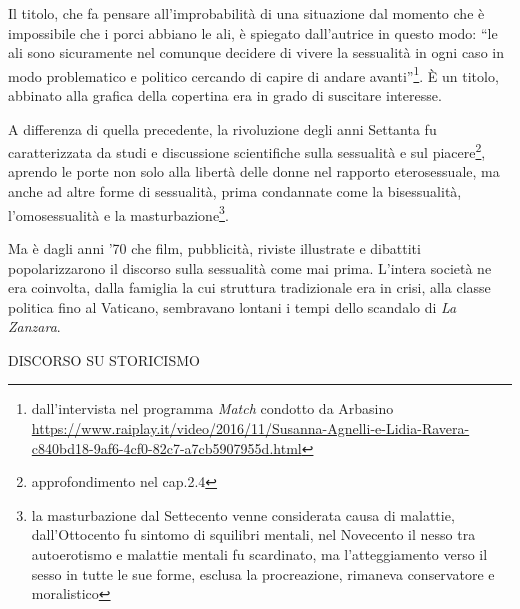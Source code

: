 Il titolo, che fa pensare all'improbabilità di una situazione dal momento che è impossibile che i porci abbiano le ali, è spiegato dall'autrice in questo modo: \enquote{le ali sono sicuramente nel comunque decidere di vivere la sessualità in ogni caso in modo problematico e politico cercando di capire di andare avanti}\footnote{dall'intervista nel programma \textit{Match} condotto da Arbasino \url{ https://www.raiplay.it/video/2016/11/Susanna-Agnelli-e-Lidia-Ravera-c840bd18-9af6-4cf0-82c7-a7cb5907955d.html}}.
È un titolo, abbinato alla grafica della copertina era in grado di suscitare interesse.





A differenza di quella precedente, la rivoluzione degli anni Settanta fu caratterizzata da studi e discussione scientifiche sulla sessualità e sul piacere\footnote{approfondimento nel cap.2.4}, aprendo le porte non solo alla libertà delle donne nel rapporto eterosessuale, ma anche ad altre forme di sessualità, prima condannate come la bisessualità, l'omosessualità e la masturbazione\footnote{la masturbazione dal Settecento venne considerata causa di malattie, dall'Ottocento fu sintomo di squilibri mentali, nel Novecento il nesso tra autoerotismo e malattie mentali fu scardinato, ma l'atteggiamento verso il sesso in tutte le sue forme, esclusa la procreazione, rimaneva conservatore e moralistico}.


Ma è dagli anni '70 che film, pubblicità, riviste illustrate e dibattiti popolarizzarono il discorso sulla sessualità come mai prima.
L'intera società ne era coinvolta, dalla famiglia la cui struttura tradizionale era in crisi, alla classe politica fino al Vaticano, sembravano lontani i tempi dello scandalo di \textit{La Zanzara}.




DISCORSO SU STORICISMO


